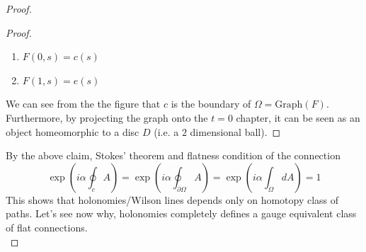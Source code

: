 \begin{proof}
\begin{proof}
\begin{enumerate}
        \item $F(0,s) = c(s)$
        \item $F(1,s) = e(s)$
    \end{enumerate}
We can see from the the figure that $c$ is the boundary of $\Omega = \text{Graph}(F)$. Furthermore, by projecting the graph onto the $t=0$ chapter, it can be seen as an object homeomorphic to a disc $D$ (i.e. a $2$ dimensional ball).
\end{proof}
By the above claim, Stokes' theorem and flatness condition of the connection
\begin{equation}
    \exp(i \alpha \oint_c A) = \exp(i \alpha \oint_{\partial \Omega} A)  = \exp(i \alpha \int_{\Omega} dA) = 1
\end{equation}
This shows that holonomies/Wilson lines depends only on homotopy class of paths. Let's see now why, holonomies completely defines a gauge equivalent class of flat connections. \\


\end{proof}
